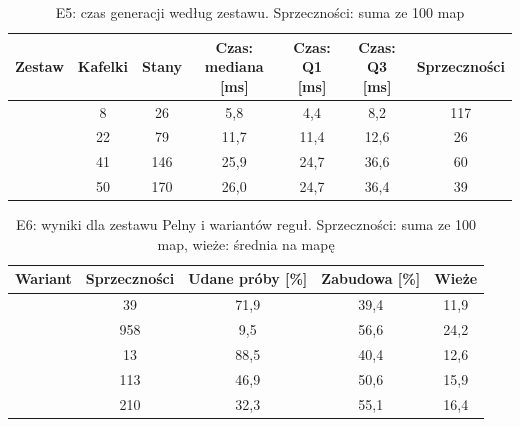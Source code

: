 
\begin{table}
  \centering
  \footnotesize
  \caption[E5: czas generacji według zestawu]{E5: czas generacji według zestawu. Sprzeczności: suma ze 100 map}
  \label{tab:e5}
  \setlength{\tabcolsep}{3pt}
  \begin{tabularx}{\linewidth}{@{}lCCCCCC@{}}
    \toprule
    Zestaw & Kafelki & Stany & Czas: mediana [ms] & Czas: Q1 [ms] & Czas: Q3 [ms] & Sprzeczności \\
    \midrule
     & 8 & 26 & 5,8 & 4,4 & 8,2 & 117 \\
     & 22 & 79 & 11,7 & 11,4 & 12,6 & 26 \\
     & 41 & 146 & 25,9 & 24,7 & 36,6 & 60 \\
     & 50 & 170 & 26,0 & 24,7 & 36,4 & 39 \\
    \bottomrule
  \end{tabularx}
\end{table}


\begin{table}
  \centering
  \footnotesize
  \caption[E6: wyniki dla zestawu Pelny i wariantów reguł]{E6: wyniki dla zestawu Pelny i wariantów reguł. Sprzeczności: suma ze 100 map, wieże: średnia na mapę}
  \label{tab:e6}
  \begin{tabularx}{\linewidth}{@{}lCCCC@{}}
    \toprule
    Wariant & Sprzeczności & Udane próby [\%] & Zabudowa [\%] & Wieże \\
    \midrule
     & 39 & 71,9 & 39,4 & 11,9 \\
     & 958 & 9,5 & 56,6 & 24,2 \\
     & 13 & 88,5 & 40,4 & 12,6 \\
     & 113 & 46,9 & 50,6 & 15,9 \\
     & 210 & 32,3 & 55,1 & 16,4 \\
    \bottomrule
  \end{tabularx}
\end{table}


